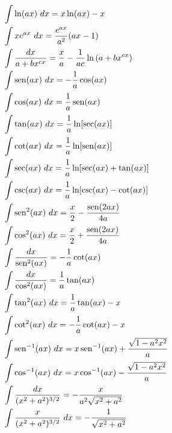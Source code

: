 \begin{minipage}[c]{0.5\textwidth}
\begin{align*}
& \int \ln (ax)\,\,dx = x\ln (ax) -x\\
& \int xe^{ax}\,\,dx = \frac{e^{ax}}{a^2}(ax-1)\\
& \int \frac{dx}{a+bx^{cx}} = \frac{x}{a} - \frac{1}{ac}\ln \left( a+bx^{cx} \right) \\
& \int \operatorname{sen} (ax)\,\,dx = -\frac{1}{a}\cos(ax)\\
& \int \cos (ax)\,\,dx = \frac{1}{a}\operatorname{sen}(ax)\\
& \int \tan (ax)\,\,dx = \frac{1}{a}\ln [\sec (ax)]\\
& \int \cot (ax)\,\,dx = \frac{1}{a}\ln [\operatorname{sen} (ax)]\\
& \int \sec (ax)\,\,dx = \frac{1}{a}\ln [\sec (ax) + \tan(ax)]  \\
& \int \csc (ax)\,\,dx = \frac{1}{a}\ln [\csc (ax) - \cot(ax)]\\
& \int \operatorname{sen}^2 (ax)\,\,dx = \frac{x}{2} - \frac{\operatorname{sen} (2ax)}{4a}\\
& \int \cos^2 (ax)\,\,dx = \frac{x}{2} + \frac{\operatorname{sen} (2ax)}{4a}\\
& \int \frac{dx}{\operatorname{sen}^2(ax)} = -\frac{1}{a}\cot (ax)\\
& \int \frac{dx}{\cos^2(ax)} = \frac{1}{a}\tan (ax)\\
& \int \tan^2 (ax)\,\,dx = \frac{1}{a}\tan(ax) -x \\
& \int \cot^2 (ax)\,\,dx = -\frac{1}{a}\cot(ax)  -x \\
& \int \operatorname{sen}^{-1} (ax)\,\,dx = x\operatorname{sen}^{-1}(ax) + \frac{\sqrt{1-a^2x^2}}{a} \\
& \int \cos^{-1} (ax)\,\,dx = x\cos^{-1}(ax) - \frac{\sqrt{1-a^2x^2}}{a} \\
& \int \frac{dx}{(x^2+a^2)^{3/2}} = -\frac{x}{a^2\sqrt{x^2+a^2}}  \\
& \int \frac{x}{(x^2+a^2)^{3/2}}\,\,dx = -\frac{1}{\sqrt{x^2+a^2}} 
\end{align*}
\end{minipage}

